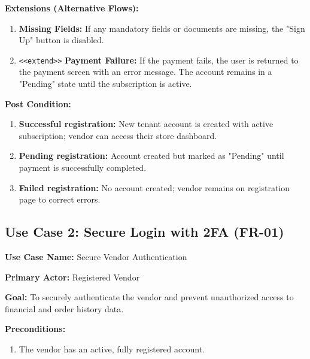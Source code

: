 \textbf{Extensions (Alternative Flows):}
\begin{enumerate}
    \item[2a.] \textbf{Missing Fields:} If any mandatory fields or documents are missing, the "Sign Up" button is disabled.
    
    \item[4a.] \texttt{\textless\textless extend\textgreater\textgreater} \textbf{Payment Failure:} If the payment fails, the user is returned to the payment screen with an error message. The account remains in a "Pending" state until the subscription is active.
\end{enumerate}

\textbf{Post Condition:}
\begin{enumerate}
    \item \textbf{Successful registration:} New tenant account is created with active subscription; vendor can access their store dashboard.
    \item \textbf{Pending registration:} Account created but marked as "Pending" until payment is successfully completed.
    \item \textbf{Failed registration:} No account created; vendor remains on registration page to correct errors.
\end{enumerate}


\subsection*{Use Case 2: Secure Login with 2FA (FR-01)}

\textbf{Use Case Name:} Secure Vendor Authentication

\textbf{Primary Actor:} Registered Vendor

\textbf{Goal:} To securely authenticate the vendor and prevent unauthorized access to financial and order history data.

\textbf{Preconditions:}
\begin{enumerate}
    \item The vendor has an active, fully registered account.
\end{enumerate}

